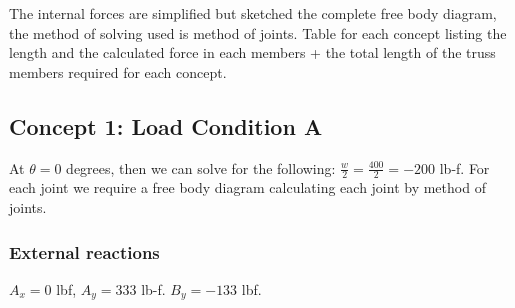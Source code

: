     The internal forces are simplified but sketched the complete free body diagram, the method of solving used is method of joints. Table for each concept listing the length and the calculated force in each members + the total length of the truss members required for each concept.

\subsection{Concept 1: Load Condition A}
	At $ \theta = 0 $ degrees, then we can solve for the following: $\frac{w}{2} = \frac{400}{2} = -200 $ lb-f. For each joint we require a free body diagram calculating each joint by method of joints.
        \subsubsection{External reactions}
$ A_x = 0 $ lbf, $A_y = 333$ lb-f. $ B_y = -133$ lbf.
